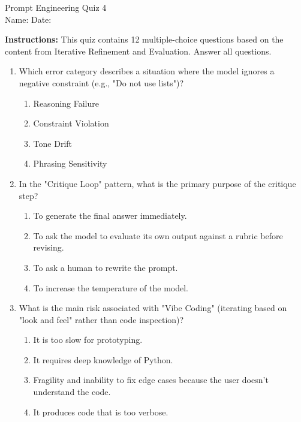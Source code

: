 \documentclass[11pt,a4paper]{article}
\begin{document}
\begin{center}
  {\LARGE Prompt Engineering \textemdash{} Quiz 4}\\[6pt]
  {\large Name: \underline{\hspace{6cm}} \quad Date: \underline{\hspace{3cm}}}
\end{center}
\vspace{0.5cm}

\textbf{Instructions:} This quiz contains 12 multiple-choice questions based on the content from Iterative Refinement and Evaluation. Answer all questions.
\vspace{0.5cm}
\begin{enumerate}[leftmargin=*, label=\textbf{\#\arabic*}]

  \item Which error category describes a situation where the model ignores a negative constraint (e.g., "Do not use lists")?\\
    \begin{enumerate}[label=\Alph*)]
      \item Reasoning Failure
      \item Constraint Violation
      \item Tone Drift
      \item Phrasing Sensitivity
    \end{enumerate}

  \item In the "Critique Loop" pattern, what is the primary purpose of the critique step?\\
    \begin{enumerate}[label=\Alph*)]
      \item To generate the final answer immediately.
      \item To ask the model to evaluate its own output against a rubric before revising.
      \item To ask a human to rewrite the prompt.
      \item To increase the temperature of the model.
    \end{enumerate}

  \item What is the main risk associated with "Vibe Coding" (iterating based on "look and feel" rather than code inspection)?\\
    \begin{enumerate}[label=\Alph*)]
      \item It is too slow for prototyping.
      \item It requires deep knowledge of Python.
      \item Fragility and inability to fix edge cases because the user doesn't understand the code.
      \item It produces code that is too verbose.
    \end{enumerate}


\end{enumerate}
\end{document}
